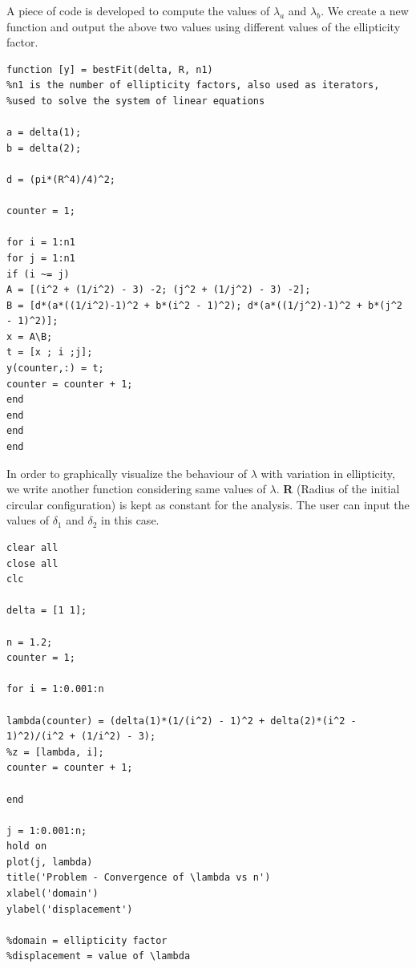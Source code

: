 \documentclass[idxtotoc,hyperref,openany]{labbook} %
\begin{document}

A piece of code is developed to compute the values of $\lambda_a$ and $\lambda_b$. We create a new function and output the above two values using different values of the ellipticity factor. 

\begin{lstlisting}
function [y] = bestFit(delta, R, n1)
%n1 is the number of ellipticity factors, also used as iterators, 
%used to solve the system of linear equations

a = delta(1);
b = delta(2);

d = (pi*(R^4)/4)^2;

counter = 1;

for i = 1:n1
for j = 1:n1
if (i ~= j)
A = [(i^2 + (1/i^2) - 3) -2; (j^2 + (1/j^2) - 3) -2];
B = [d*(a*((1/i^2)-1)^2 + b*(i^2 - 1)^2); d*(a*((1/j^2)-1)^2 + b*(j^2 - 1)^2)];
x = A\B;
t = [x ; i ;j];
y(counter,:) = t;
counter = counter + 1; 
end
end
end 
end
\end{lstlisting}

In order to graphically visualize the behaviour of $\lambda$ with variation in ellipticity, we write another function considering same values of $\lambda$. \textbf{R} (Radius of the initial circular configuration) is kept as constant for the analysis. The user can input the values of $\delta_1$ and $\delta_2$ in this case. 

\begin{lstlisting}
clear all
close all
clc

delta = [1 1];

n = 1.2;
counter = 1;

for i = 1:0.001:n

lambda(counter) = (delta(1)*(1/(i^2) - 1)^2 + delta(2)*(i^2 - 1)^2)/(i^2 + (1/i^2) - 3);
%z = [lambda, i];
counter = counter + 1;

end

j = 1:0.001:n; 
hold on
plot(j, lambda)
title('Problem - Convergence of \lambda vs n')
xlabel('domain')
ylabel('displacement')

%domain = ellipticity factor 
%displacement = value of \lambda

\end{lstlisting}
 

\end{document}
